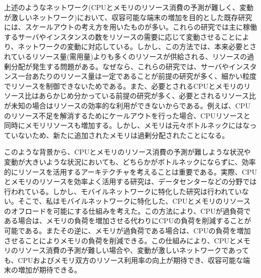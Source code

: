 \documentclass[a4j]{ujarticle}
\begin{document}
上述のようなネットワーク(CPUとメモリのリソース消費の予測が難しく、変動が激しいネットワーク)において、収容可能な端末の増加を目的とした既存研究には、スケールアウトの考え方を用いたものが多い。これらの研究では主に稼働するサーバやインスタンスの数をリソースの需要に応じて変動させることにより、ネットワークの変動に対応している。しかし、この方法では、本来必要とされているリソース量(需用量)よりも多くのリソースが供給される、リソースの過剰分配が発生する問題がある。なぜなら、これらの研究では、サーバやインスタンス一台あたりのリソース量は一定であることが前提の研究が多く、細かい粒度でリソースを制御できないためである。また、必要とされるCPUとメモリのリソース比はあらかじめ分かっている前提の研究が多く、必要とされるリソース比が未知の場合はリソースの効率的な利用ができないからである。例えば、CPUのリソース不足を解消するためにケールアウトを行った場合、CPUリソースと同時にメモリリソースも増加する。しかし、メモリは元々ボトルネックにはなっていないため、新たに追加されたメモリは過剰分配されたことになる。


このような背景から、CPUとメモリのリソース消費の予測が難しような状況や変動が大きいような状況においても、どちらかがボトルネックにならずに、効率的にリソースを活用するアーキテクチャを考えることは重要である。実際、CPUとメモリのリソースを効率よく活用する研究は、データセンターなどの分野では行われている。しかし、モバイルネットワークに特化した研究は行われていない。そこで、私はモバイルネットワークに特化した、CPUとメモリのリソースのオフロードを可能にする仕組みを考えた。この方法により、CPUが過負荷である場合は、メモリの負荷を増加させる代わりにCPUの負荷を削減することが可能である。またその逆に、メモリが過負荷である場合は、CPUの負荷を増加させることによりメモリの負荷を削減できる。この仕組みにより、CPUとメモリのリソース消費の予測が難しい場合や、変動が激しいネットワークであっても、CPUおよびメモリ双方のリソース利用率の向上が期待でき、収容可能な端末の増加が期待できる。

\end{document}
